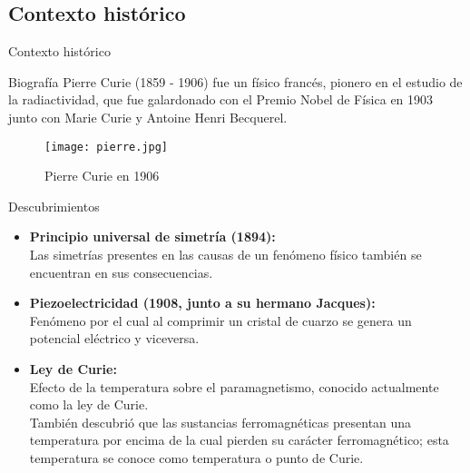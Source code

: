 \documentclass[10pt]{beamer}
\begin{document}
    \subsection{\textrm{Contexto histórico}}
    \begin{frame}{\textrm{Contexto histórico}}
        \begin{block}{Biografía}
            Pierre Curie (1859 - 1906) fue un físico francés, pionero en el estudio de la radiactividad, que fue galardonado con el Premio Nobel de Física en 1903 junto con Marie Curie y Antoine Henri Becquerel.
        \end{block}
        \begin{figure}
                \centering
                \texttt{[image: pierre.jpg]}
                \caption{Pierre Curie en 1906}
                \label{fig:dominio}
        \end{figure}        
    \end{frame}
    \begin{frame}
        \begin{block}{Descubrimientos}
            \vspace{0.4cm}
            \begin{itemize}
                \item \textbf{Principio universal de simetría (1894):}\\ Las simetrías presentes en las causas de un fenómeno físico también se encuentran en sus consecuencias. \vspace{0.4cm}
                \item \textbf{Piezoelectricidad (1908, junto a su hermano Jacques):}\\Fenómeno por el cual al comprimir un cristal de cuarzo se genera un potencial eléctrico y viceversa. \vspace{0.4cm}
                \item \textbf{Ley de Curie:}\\ Efecto de la temperatura sobre el paramagnetismo, conocido actualmente como la ley de Curie. \\También descubrió que las sustancias ferromagnéticas presentan una temperatura por encima de la cual pierden su carácter ferromagnético; esta temperatura se conoce como temperatura o punto de Curie.
            \end{itemize}             
        \end{block}
    \end{frame}

\end{document}
